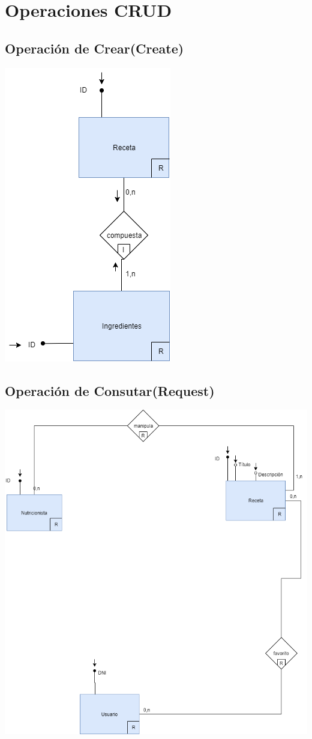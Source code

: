 \documentclass[12pt,letterpaper]{article}
\begin{document}
\section{Operaciones CRUD}
\subsection{Operación de Crear(Create)}
\includegraphics[scale=0.6]{Asignar.png}
\subsection{Operación de Consutar(Request)}
\includegraphics[scale=0.3]{Buscar.png}
\end{document}
